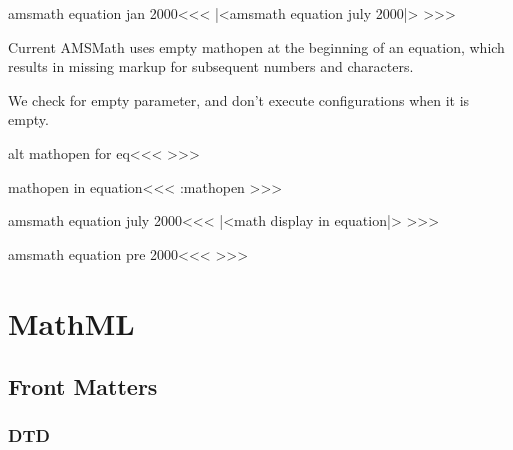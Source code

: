 
   



\<amsmath equation jan 2000\><<<
|<amsmath equation july 2000|>%
>>>

Current AMSMath uses empty mathopen at the beginning of an equation, 
which results in missing markup for subsequent numbers and characters.

We check for empty parameter, and don't execute configurations when it is empty.

\<alt mathopen for eq\><<<
\def\eq:mathopen#1{\ifx\relax#1\relax\else\a:mathopen\fi\o:mathopen:{#1}}
>>>

\<mathopen in equation\><<<
\let\mathopen\eq:mathopen%
>>>





\<amsmath equation july 2000\><<<
     {\IgnorePar 
         |<math display in equation|>}
     {}
     {}
     {}
     {\ifnum{} \IgnorePar
         \fi }
     {}
>>>

\<amsmath equation pre 2000\><<<
\Configure{$$}{}{}{}%
  {\Configure{$$}
    {\IgnorePar\EndP\DviMath}
    {\EndDviMath\EndP}%
    {}%
   \IgnorePar
  }{}{}{}{}{}
>>>









\chapter{MathML}
\section{Front Matters}



\subsection{DTD}

